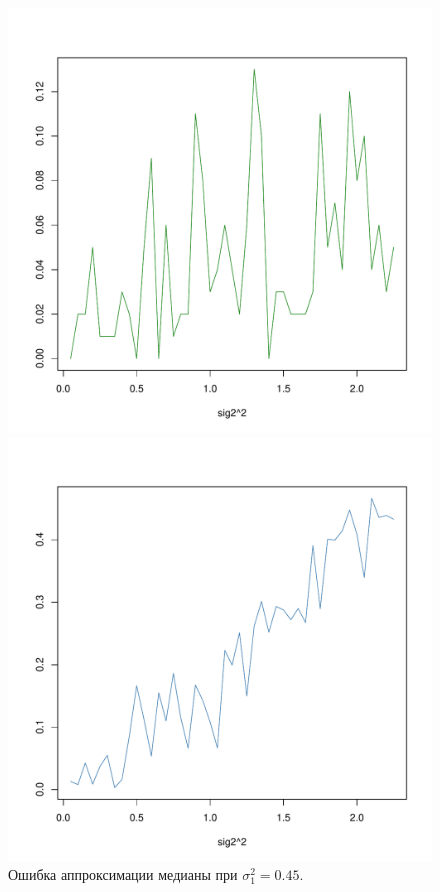 \documentclass[12pt]{article}
\begin{document}
\begin{figure}[h]
	\begin{center}
		\begin{minipage}[h]{0.4\linewidth}
			\includegraphics[width=1\linewidth]{gr1.pdf}
			\caption{Ошибка аппроксимации медианы при $\sigma_{1}^{2} = 0.45$.} %
			\label{ris7} %
		\end{minipage}
		\hfill
		\begin{minipage}[h]{0.4\linewidth}
			\includegraphics[width=1\linewidth]{gr2.pdf}

\end{minipage}
\end{center}
\end{figure}
\end{document}
